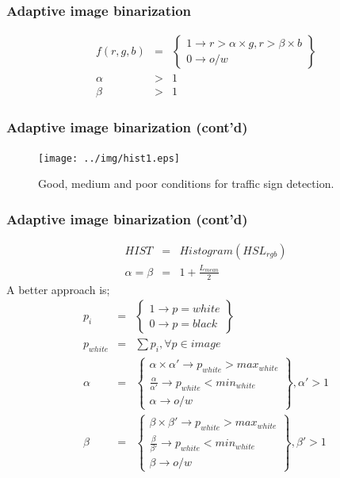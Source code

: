 \documentclass{beamer}
\begin{document}
\frame
{
  \frametitle{Adaptive image binarization}
	\begin{eqnarray}
	\label{eq1}
	f(r,g,b)&=& \left\{\begin{array}{l} 1 \rightarrow r>\alpha \times g, r>\beta \times b \\ 
																			0 \rightarrow o/w \end{array}\right\}\\
	\nonumber \alpha &>& 1 \\
	\nonumber \beta &>& 1
	\end{eqnarray}
	
}

\frame
{
  \frametitle{Adaptive image binarization (cont'd)}
  \begin{figure}[ht]
	\begin{center}
	\texttt{[image: ../img/hist1.eps]}
	\caption{Good, medium and poor conditions for traffic sign detection.}
	\label{fig:hist1}
	\end{center}
	\end{figure}
}


\frame
{
	\frametitle{Adaptive image binarization (cont'd)}
	\vspace*{-2mm}
	{\footnotesize
	\begin{eqnarray}
	\label{eq2}
	HIST &=& Histogram(HSL_{rgb}) \\
	\nonumber \alpha = \beta &=& 1 + \frac {L_{mean}}{2}
	\end{eqnarray}
	A better approach is;
  \begin{eqnarray}
	\label{eq3}
	p_{i} &=& \left\{\begin{array}{l} 1 \rightarrow p=white \\ 0 \rightarrow p=black \end{array}\right\}\\
	\nonumber p_{white} &=& \sum{p_{i}}, \forall p \in image \\
	\nonumber \alpha &=& \left\{\begin{array}{l} \alpha \times \alpha' \rightarrow p_{white}>max_{white} \\ \frac{\alpha}{\alpha'}\rightarrow p_{white}<min_{white} \\ \alpha \rightarrow o/w \end{array}\right\}, \alpha'>1\\
	\nonumber \beta &=& \left\{\begin{array}{l} \beta \times \beta' \rightarrow p_{white}>max_{white} \\ \frac{\beta}{\beta'}\rightarrow p_{white}<min_{white} \\ \beta \rightarrow o/w \end{array}\right\}, \beta'>1
	\end{eqnarray}
	}
}
\end{document}
